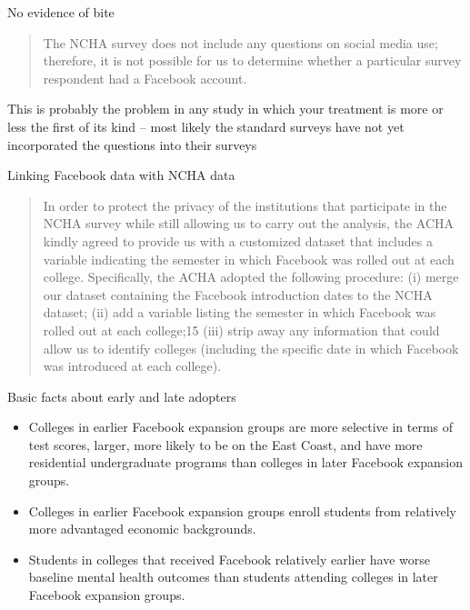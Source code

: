 \documentclass{beamer}
\begin{document}
\begin{frame}{No evidence of bite}

\begin{quote}
The NCHA survey does not include any questions on social media use; therefore, it is not possible for us to determine whether a particular survey respondent had a Facebook account.
\end{quote}

\bigskip

This is probably the problem in any study in which your treatment is more or less the first of its kind -- most likely the standard surveys have not yet incorporated the questions into their surveys

\end{frame}

\begin{frame}{Linking Facebook data with NCHA data}

\begin{quote}
In order to protect the privacy of the institutions that participate in the NCHA survey while still allowing us to carry out the analysis, the ACHA kindly agreed to provide us with a customized dataset that includes a variable indicating the semester in which Facebook was rolled out at each college. Specifically, the ACHA adopted the following procedure: (i) merge our dataset containing the Facebook introduction dates to the NCHA dataset; (ii) add a variable listing the semester in which Facebook was rolled out at each college;15 (iii) strip away any information that could allow us to identify colleges (including the specific date in which Facebook was introduced at each college).
\end{quote}

\end{frame}

\begin{frame}{Basic facts about early and late adopters}

\begin{itemize}
\item Colleges in earlier Facebook expansion groups are more selective in terms of test scores, larger, more likely to be on the East Coast, and have more residential undergraduate programs than colleges in later Facebook expansion groups. 

\item Colleges in earlier Facebook expansion groups enroll students from relatively more advantaged economic backgrounds. 

\item Students in colleges that received Facebook relatively earlier have worse baseline mental health outcomes than students attending colleges in later Facebook expansion groups. 


\end{itemize}

\end{frame}
\end{document}
